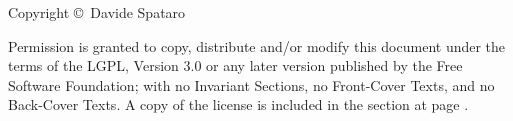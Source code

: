 
\noindent
Copyright \copyright \the\year\ Davide Spataro\par
Permission is granted to copy, distribute and/or modify this document under the terms of the LGPL, Version 3.0 or any later version published by the Free Software Foundation; with no Invariant Sections, no Front-Cover Texts, and no Back-Cover Texts. A copy of the license is included in the section  at page \pageref{license:gnu}. 
\clearpage




